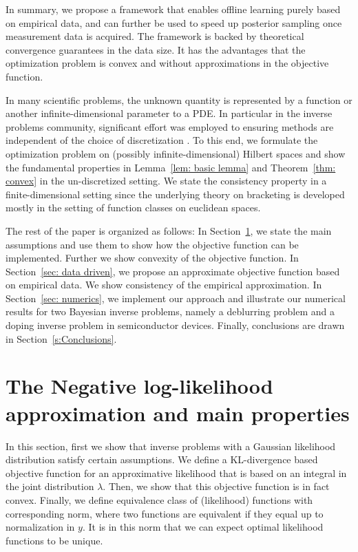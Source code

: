 \documentclass{amsart}
\theoremstyle{definition}
\begin{document}
In summary, we propose a framework that enables offline learning purely based on empirical data, and can further be used to speed up posterior sampling once measurement data is acquired. The framework is backed by theoretical convergence guarantees in the data size. It has the advantages that the optimization problem is convex and without approximations in the objective function.

In many scientific problems, the unknown quantity is represented by a function or another infinite-dimensional parameter to a PDE. In particular in the inverse problems community, significant effort was employed to ensuring methods are independent of the choice of discretization \cite{Lehtinen1989Linear, Lassas2009InverseProblemsandImaging}. To this end, we formulate the optimization problem on (possibly infinite-dimensional) Hilbert spaces and show the fundamental properties in Lemma~\ref{lem: basic lemma} and Theorem~\ref{thm: convex} in the un-discretized setting. We state the consistency property in a finite-dimensional setting since the underlying theory on bracketing is developed mostly in the setting of function classes on euclidean spaces. 



The rest of the paper is organized as follows: In Section~\ref{s:NLL approximation}, we state the main assumptions and use them to show how the objective function can be implemented. Further we show convexity of the objective function. In Section~\ref{sec: data driven}, we propose an approximate objective function based on empirical data. We show consistency of the empirical approximation. In Section~\ref{sec: numerics}, we implement our approach and illustrate our numerical results for two Bayesian inverse problems, namely a deblurring problem and a doping inverse problem in semiconductor devices. Finally, conclusions are drawn in Section~\ref{s:Conclusions}.
\section{The Negative log-likelihood approximation and main properties}\label{s:NLL approximation}
In this section, first we show that inverse problems with a Gaussian likelihood distribution satisfy certain assumptions. We define a KL-divergence based objective function for an approximative likelihood that is based on an integral in the joint distribution $\lambda$. Then, we show that this objective function is in fact convex.
Finally, we define equivalence class of (likelihood) functions with corresponding norm, where two functions are equivalent if they equal up to normalization in $y$. It is in this norm that we can expect optimal likelihood functions to be unique.
\end{document}
